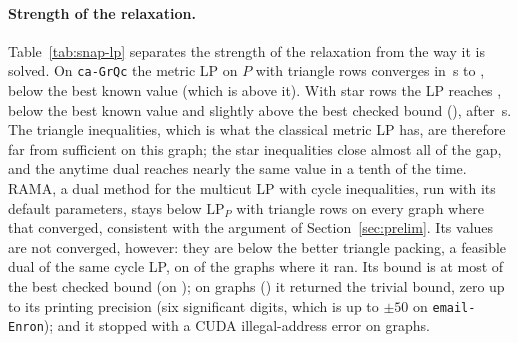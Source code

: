 \paragraph{Strength of the relaxation.}  Table~\ref{tab:snap-lp} separates
the strength of the relaxation from the way it is solved.  On
\texttt{ca-GrQc} the metric LP on $P$ with triangle rows converges in
\numGrqcTriTime{}\,s to \numGrqcTri{}, \numGrqcTriBelow{} below the best
known value (which is \numGrqcTriGap{} above it).  With star rows the LP reaches \numGrqcStar{}, \numGrqcStarGap{} below
the best known value and slightly above the best checked bound
(\numGrqcBest{}), after \numGrqcStarTime{}\,s.  The triangle inequalities,
which is what the classical metric LP has, are therefore far from sufficient
on this graph; the star inequalities close almost all of the gap, and the
anytime dual reaches nearly the same value in a tenth of the time.
RAMA, a dual method for the multicut LP with cycle inequalities, run with
its default parameters, stays below $\mathrm{LP}_P$ with triangle rows on
every graph where that converged, consistent with the argument of
Section~\ref{sec:prelim}.  Its values are not converged, however: they are
below the better triangle packing, a feasible dual of the same cycle LP, on
\numRamaBelowTri{} of the \numRamaOk{} graphs where it ran.  Its bound is at most
\numRamaFracMax{} of the best checked bound (on \numRamaFracMaxGraph{}); on
\numRamaNearZero{} graphs (\numRamaNearZeroList{}) it returned the trivial
bound, zero up to its printing precision (six significant digits, which is
up to $\pm50$ on \texttt{email-Enron}); and it stopped with a CUDA
illegal-address error on \numRamaFailed{} graphs.
